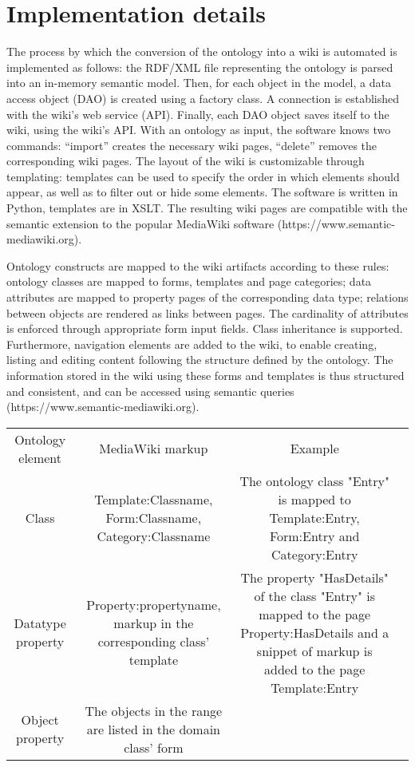 \documentclass{ijcs_template}
\begin{document}
\section{Implementation details}
The process by which the conversion of the ontology into a wiki is automated is implemented as follows: the RDF/XML file representing the ontology is parsed into an in-memory semantic model. Then, for each object in the model, a data access object (DAO) is created using a factory class. A connection is established with the wiki's web service (API). Finally, each DAO object saves itself to the wiki, using the wiki's API. With an ontology as input, the software knows two commands: ``import'' creates the necessary wiki pages, ``delete'' removes the corresponding wiki pages. The layout of the wiki is customizable through templating: templates can be used to specify the order in which elements should appear, as well as to filter out or hide some elements. The software is written in Python, templates are in XSLT. The resulting wiki pages are compatible with the semantic extension to the popular MediaWiki software (https://www.semantic-mediawiki.org).

Ontology constructs are mapped to the wiki artifacts according to these rules: ontology classes are mapped to forms, templates and page categories; data attributes are mapped to property pages of the corresponding data type; relations between objects are rendered as links between pages. The cardinality of attributes is enforced through appropriate form input fields. Class inheritance is supported. Furthermore, navigation elements are added to the wiki, to enable creating, listing and editing content following the structure defined by the ontology. The information stored in the wiki using these forms and templates is thus structured and consistent, and can be accessed using semantic queries (https://www.semantic-mediawiki.org).

\begin{table}[th]
  {\begin{tabular}{@{}cccc@{}} \toprule
     Ontology element & MediaWiki markup & Example \\
     Class & Template:Classname, Form:Classname, Category:Classname & The ontology class "Entry" is mapped to Template:Entry, Form:Entry and Category:Entry \\
     Datatype property & Property:propertyname, markup in the corresponding class' template & The property "HasDetails" of the class "Entry" is mapped to the page Property:HasDetails and a snippet of markup is added to the page Template:Entry \\
     Object property & The objects in the range are listed in the domain class' form & 
   \end{tabular} }
\end{table}
\end{document}
